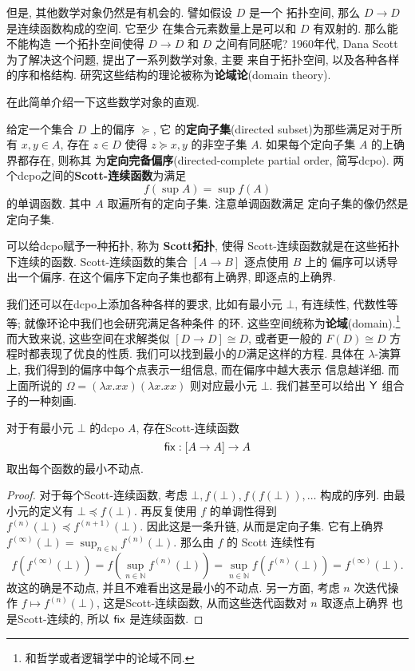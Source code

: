 但是, 其他数学对象仍然是有机会的. 譬如假设 \(D\) 是一个
拓扑空间, 那么 \(D \to D\) 是连续函数构成的空间. 它至少
在集合元素数量上是可以和 \(D\) 有双射的. 那么能不能构造
一个拓扑空间使得 \(D \to D\) 和 \(D\) 之间有同胚呢?
1960年代, Dana Scott 为了解决这个问题, 提出了一系列数学对象, 主要
来自于拓扑空间, 以及各种各样的序和格结构.
研究这些结构的理论被称为\textbf{论域论}(domain theory).

在此简单介绍一下这些数学对象的直观.
\begin{definition}
给定一个集合 \(D\) 上的偏序 \(\succeq\), 它
的\textbf{定向子集}(directed subset)为那些满足对于所有 \(x,y\in A\),
存在 \(z \in D\) 使得 \(z \succeq x, y\) 的非空子集
\(A\). 如果每个定向子集 \(A\) 的上确界都存在, 则称其
为\textbf{定向完备偏序}(directed-complete partial order, 简写dcpo).
两个dcpo之间的\textbf{Scott-连续函数}为满足
\[f\left(\sup A\right) = \sup f(A)\]
的单调函数. 其中 \(A\) 取遍所有的定向子集. 注意单调函数满足
定向子集的像仍然是定向子集.
\end{definition}
可以给dcpo赋予一种拓扑, 称为 \textbf{Scott拓扑},
使得 Scott-连续函数就是在这些拓扑下连续的函数.
Scott-连续函数的集合 \([A \to B]\) 逐点使用 \(B\) 上的
偏序可以诱导出一个偏序. 在这个偏序下定向子集也都有上确界,
即逐点的上确界.

我们还可以在dcpo上添加各种各样的要求, 比如有最小元 \(\bot\),
有连续性, 代数性等等; 就像环论中我们也会研究满足各种条件
的环. 这些空间统称为\textbf{论域}(domain).\footnote{和哲学或者逻辑学中的论域不同.}
而大致来说, 这些空间在求解类似 \([D \to D] \cong D\),
或者更一般的 \(F(D) \cong D\) 方程时都表现了优良的性质.
我们可以找到最小的\(D\)满足这样的方程. 具体在 \(\lambda\)-演算
上, 我们得到的偏序中每个点表示一组信息, 而在偏序中越大表示
信息越详细. 而上面所说的 \(\Omega = (\lambda x. xx) (\lambda x.xx)\)
则对应最小元 \(\bot\). 我们甚至可以给出 \(\textnormal{\textsf{Y}}\)
组合子的一种刻画.
\begin{lemma}
对于有最小元 \(\bot\) 的dcpo \(A\),
存在Scott-连续函数
\[\textnormal{\textsf{fix}} : [A \to A] \to A\]
取出每个函数的最小不动点.
\end{lemma}
\begin{proof}
对于每个Scott-连续函数,
考虑 \(\bot, f(\bot), f(f(\bot)),\dots\) 构成的序列.
由最小元的定义有 \(\bot \preceq f(\bot)\). 再反复使用
\(f\) 的单调性得到 \(f^{(n)}(\bot) \preceq f^{(n+1)}(\bot)\).
因此这是一条升链, 从而是定向子集. 它有上确界
\(f^{(\infty)}(\bot) = \sup_{n\in\mathbb N}f^{(n)}(\bot).\)
那么由 \(f\) 的 Scott 连续性有
\[f(f^{(\infty)}(\bot)) = f(\sup_{n\in\mathbb N}f^{(n)}(\bot))
= \sup_{n\in\mathbb N} f(f^{(n)}(\bot)) = f^{(\infty)}(\bot).\]
故这的确是不动点, 并且不难看出这是最小的不动点.
另一方面, 考虑 \(n\) 次迭代操作 \(f \mapsto f^{(n)}(\bot)\),
这是Scott-连续函数, 从而这些迭代函数对 \(n\) 取逐点上确界
也是Scott-连续的, 所以 \(\textnormal{\textsf{fix}}\) 是连续函数.
\end{proof}

